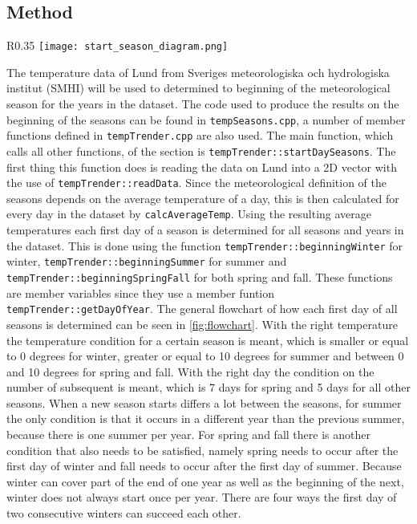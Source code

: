 \subsection{Method}

\begin{wrapfigure}{R}{0.35\textwidth}
\texttt{[image: start\_season\_diagram.png]}
\caption{The code used for the calculation of the start of a season represented in a flowchart.}
\label{fig:flowchart}
\end{wrapfigure}

The temperature data of Lund from Sveriges meteorologiska och hydrologiska institut (SMHI) will be used to determined to beginning of the meteorological season for the years in the dataset.  The code used to produce the results on the beginning of the seasons can be found in \texttt{tempSeasons.cpp}, a number of member functions defined in \texttt{tempTrender.cpp} are also used.  The main function, which calls all other functions, of the section is \texttt{tempTrender::startDaySeasons}.  The first thing this function does is reading the data on Lund into a 2D vector with the use of \texttt{tempTrender::readData}. Since the meteorological definition of the seasons depends on the average temperature of a day, this is then calculated for every day in the dataset by  \texttt{calcAverageTemp}. Using the resulting average temperatures each first day of a season is determined for all seasons and years in the dataset. This is done using the function \texttt{tempTrender::beginningWinter} for winter,  \texttt{tempTrender::beginningSummer} for summer and \texttt{tempTrender::beginningSpringFall} for both spring and fall.  These functions are member variables since they use a member funtion \texttt{tempTrender::getDayOfYear}. The general flowchart of how each first day of all seasons is determined can be seen in \ref{fig:flowchart}. With the right temperature the temperature condition for a certain season is meant, which is smaller or equal to 0 degrees for winter, greater or equal to 10 degrees for summer and between 0 and 10 degrees for spring and fall. With the right day the condition on the number of subsequent is meant, which is 7 days for spring and 5 days for all other seasons. When a new season starts differs a lot between the seasons, for summer the only condition is that it occurs in a different year than the previous summer, because there is one summer per year. For spring and fall there is another condition that also needs to be satisfied, namely spring needs to occur after the first day of winter and fall needs to occur after the first day of summer. Because winter can cover part of the end of one year as well as the beginning of the next, winter does not always start once per year. There are four ways the first day of two consecutive winters can succeed each other. 
\newline

